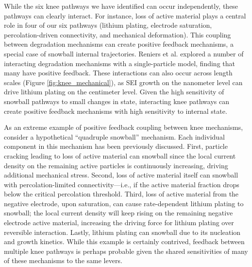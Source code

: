 \documentclass[journal=jpclcd,manuscript=article]{achemso}
\begin{document}
While the six knee pathways we have identified can occur independently, these pathways can clearly interact. For instance, loss of active material plays a central role in four of our six pathways (lithium plating, electrode saturation, percolation-driven connectivity, and mechanical deformation). This coupling between degradation mechanisms can create positive feedback mechanisms, a special case of snowball internal trajectories.
Reniers et al.\cite{reniers_review_2019} explored a number of interacting degradation mechanisms with a single-particle model, finding that many have positive feedback. These interactions can also occur across length scales (Figure \ref{fig:knee_mechanical}), as SEI growth on the nanometer level can drive lithium plating on the centimeter level.
Given the high sensitivity of snowball pathways to small changes in state, interacting knee pathways can create positive feedback mechanisms with high sensitivity to internal state.

As an extreme example of positive feedback coupling between knee mechanisms, consider a hypothetical “quadruple snowball” mechanism. Each individual component in this mechanism has been previously discussed. First, particle cracking leading to loss of active material can snowball since the local current density on the remaining active particles is continuously increasing, driving additional mechanical stress. Second, loss of active material itself can snowball with percolation-limited connectivity---i.e., if the active material fraction drops below the critical percolation threshold. Third, loss of active material from the negative electrode, upon saturation, can cause rate-dependent lithium plating to snowball; the local current density will keep rising on the remaining negative electrode active material, increasing the driving force for lithium plating over reversible interaction. Lastly, lithium plating can snowball due to its nucleation and growth kinetics. While this example is certainly contrived, feedback between multiple knee pathways is perhaps probable given the shared sensitivities of many of these mechanisms to the same levers. 
\end{document}
